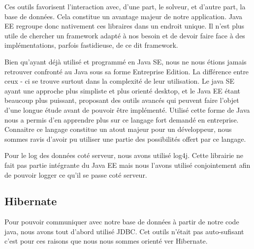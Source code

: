 Ces outils favorisent l'interaction avec, d'une part, le solveur, et d'autre part, la base de données. Cela constitue un avantage majeur de notre application. Java EE regroupe donc nativement ces libraires dans un endroit unique. Il n'est plus utile de chercher un framework adapté à nos besoin et de devoir faire face à des implémentations, parfois fastidieuse, de ce dit framework.

Bien qu'ayant déjà utilisé et programmé en Java SE, nous ne nous étions jamais retrouver confronté au Java sous sa forme Entreprise Edition. La différence entre ceux - ci se trouve surtout dans la complexité de leur utilisation. Le java SE ayant une approche plus simpliste et plus orienté desktop, et le Java EE étant beaucoup plus puissant, proposant des outils avancés qui peuvent faire l'objet d'une longue étude avant de pouvoir être implémenté. Utilisé cette forme de Java nous a permis d'en apprendre plus sur ce langage fort demandé en entreprise. Connaitre ce langage constitue un atout majeur pour un développeur, nous sommes ravis d'avoir pu utiliser une partie des possibilités offert par ce langage.

Pour le log des données coté serveur, nous avons utilisé log4j. Cette librairie ne fait pas partie intégrante du Java EE mais nous l'avons utilisé conjointement afin de pouvoir logger ce qu'il se passe coté serveur.

\subsection{Hibernate}

Pour pouvoir communiquer avec notre base de données à partir de notre code java, nous avons tout d'abord utilisé JDBC. Cet outils n'était pas auto-sufisant c'est pour ces raisons que nous nous sommes orienté ver Hibernate.

